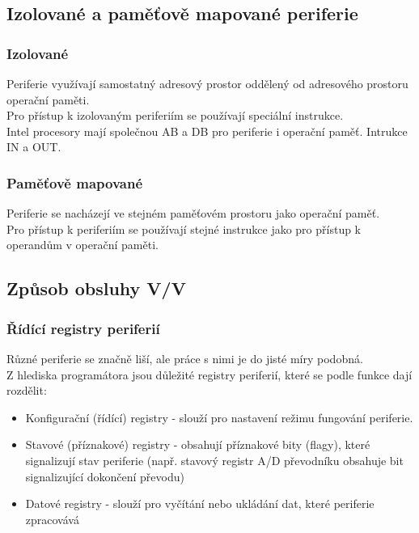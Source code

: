 \subsection{Izolované a paměťově mapované periferie}
\subsubsection{Izolované}
Periferie využívají samostatný adresový prostor oddělený od adresového prostoru operační paměti.\\
Pro přístup k izolovaným periferiím se používají speciální instrukce.\\
Intel procesory mají společnou AB a DB pro periferie i operační paměť. Intrukce IN a OUT.

\subsubsection*{Paměťově mapované}
Periferie se nacházejí ve stejném paměťovém prostoru jako operační paměť. \\
Pro přístup k periferiím se používají stejné instrukce jako pro přístup k operandům v operační paměti.\\
\subsection{Způsob obsluhy V/V}
\subsubsection*{Řídící registry periferií}
Různé periferie se značně liší, ale práce s nimi je do jisté míry podobná.\\
Z hlediska programátora jsou důležité registry periferií, které se podle funkce dají rozdělit:
\begin{itemize}
    \item Konfigurační (řídící) registry - slouží pro nastavení režimu fungování periferie.
    \item Stavové (příznakové) registry - obsahují příznakové bity (flagy), které signalizují stav periferie (např. stavový registr A/D převodníku obsahuje bit signalizující dokončení převodu)
    \item Datové registry - slouží pro vyčítání nebo ukládání dat, které periferie zpracovává
\end{itemize}

